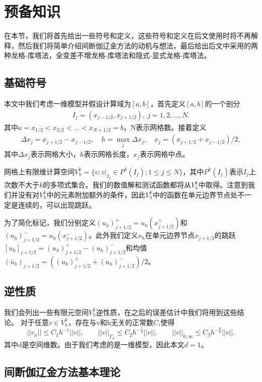 \cleardoublepage

\section{预备知识}
在本节，我们将首先给出一些符号和定义，这些符号和定义在后文使用时将不再解释，然后我们将简单介绍间断伽辽金方法的动机与想法，最后给出后文中采用的两种龙格-库塔法，全变差不增龙格-库塔法和隐式-显式龙格-库塔法。
\subsection{基础符号}
本文中我们考虑一维模型并假设计算域为$[a,b]$，首先定义$[a,b]$的一个剖分
\begin{align*}
	I_{j} = (x_{j-1/2}, x_{j+1/2}), \ j = 1, 2, ..., N.
\end{align*}
其中$a=x_{1/2} < x_{3/2}< ...< x_{N+1/2}=b$，N表示网格数。接着定义
\begin{align*}
	\Delta x_j = x_{j+1/2}-x_{j-1/2}, \quad h = \max_j{\Delta x_j}, \quad x_j = (x_{j+1/2}+x_{j-1/2})/{2},
\end{align*}
其中$\Delta x_j$表示网格大小，$h$表示网格长度，$x_j$表示网格中点。

网格上有限维计算空间$V_h^k = \{v:v|_{I_j}\in P^k(I_j); 1\leq j\leq N\}$，其中$P^k(I_j)$表示$I_j$上次数不大于$k$的多项式集合。我们的数值解和测试函数都将从$V_h^k$中取得。注意到我们并没有对$V^k_h$中的元素附加额外的条件，因此$V_h^k$中的函数在单元边界节点处不一定是连续的，可以出现跳跃。

为了简化标记，我们分别定义$(u_h)^+_{j+1/2}=u_h(x^+_{j+1/2})$和$(u_h)^-_{j+1/2}=u_h(x^-_{j+1/2})$。此外我们定义$u_h$在单元边界节点$x_{j+1/2}$的跳跃$[u_h]_{j+1/2}=(u_h)^+_{j+1/2}-(u_h)^-_{j+1/2}$和均值$(\overline{u}_h)_{j+1/2}=((u_h)_{j+1/2}^++(u_h)_{j+1/2}^-)/2$。
\subsection{逆性质}
我们会列出一些有限元空间$V_h^k$逆性质\cite{ciarlet1978finite}，在之后的误差估计中我们将用到这些结论。
对于任意$v \in V_h^k$，存在与v和h无关的正常数$C_i$使得
\begin{equation}
	||v_x|| \leq C_1 h^{-1} ||v||, \qquad
	||v||_{\Gamma_h} \leq C_2 h^{-\frac{1}{2}}||v||, \qquad
	||v||_{0,\infty} \leq C_3 h^{-\frac{d}{2}}||v||.
\end{equation}
其中d是空间维数。由于我们考虑的是一维模型，因此本文$d=1$。
\subsection{间断伽辽金方法基本理论}

